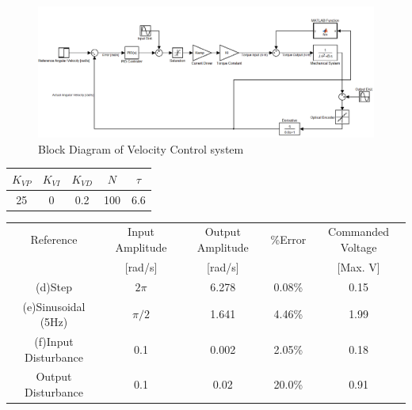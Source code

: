 \documentclass{article}
\theoremstyle{plain}
\theoremstyle{definition}
\theoremstyle{remark}
\begin{document}
\begin{figure}[htb]
\begin{center}
\includegraphics[height = 8 cm, width = 18 cm]{q3_11}
\caption{Block Diagram of Velocity Control system}
\label{q3_11}
\end{center}
\end{figure}

\begin{table}[htb]
\begin{center}
    \begin{tabular}{|c|c|c|c|c|}
        \hline
        $K_{VP}$ & $K_{VI}$ & $K_{VD}$ & $N$ & $\tau$ \\ \hline
        25       & 0        & 0.2      & 100 & 6.6    \\
        \hline
    \end{tabular}
\end{center}
\end{table}

\begin{table}[htb]
\begin{center}
    \begin{tabular}{|c|c|c|c|c|}
        \hline
        Reference            & Input Amplitude & Output Amplitude & \%Error & Commanded Voltage \\ 
        ~                    & [rad/s]                 & [rad/s]                  & ~       & [Max. V]                   \\ \hline
        (d)Step              & $2\pi$                  & 6.278                    & 0.08\%  & 0.15                       \\ 
        (e)Sinusoidal (5Hz)        & $\pi/2$                 & 1.641                    & 4.46\%  & 1.99                       \\ 
        (f)Input Disturbance & 0.1                     & 0.002                    & 2.05\%  & 0.18                       \\ 
        Output Disturbance   & 0.1                     & 0.02                     & 20.0\%  & 0.91                       \\
        \hline
    \end{tabular}
\end{center}
\end{table}
\end{document}
